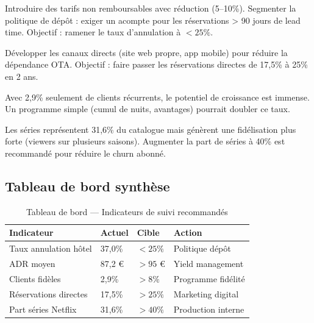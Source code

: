 \documentclass[12pt,a4paper]{article}
\begin{document}
\begin{description}[leftmargin=1.5cm, style=nextline]
  \item[\textcolor{hotel}{\textbf{Réduire les annulations hôtelières}}]
    Introduire des tarifs non remboursables avec réduction (5--10\%). Segmenter la politique de dépôt : exiger un acompte pour les réservations > 90 jours de lead time. Objectif : ramener le taux d'annulation à $< 25\%$.

  \item[\textcolor{gold}{\textbf{Optimiser le mix de distribution}}]
    Développer les canaux directs (site web propre, app mobile) pour réduire la dépendance OTA. Objectif : faire passer les réservations directes de 17,5\% à 25\% en 2 ans.

  \item[\textcolor{green}{\textbf{Développer la fidélisation}}]
    Avec 2,9\% seulement de clients récurrents, le potentiel de croissance est immense. Un programme simple (cumul de nuits, avantages) pourrait doubler ce taux.

  \item[\textcolor{netflix}{\textbf{Diversification du catalogue Netflix}}]
    Les séries représentent 31,6\% du catalogue mais génèrent une fidélisation plus forte (viewers sur plusieurs saisons). Augmenter la part de séries à 40\% est recommandé pour réduire le churn abonné.
\end{description}

\subsection{Tableau de bord synthèse}

\begin{table}[h!]
  \centering
  \caption{Tableau de bord — Indicateurs de suivi recommandés}
  \begin{tabular}{p{4cm}p{3cm}p{3cm}p{4cm}}
    \toprule
    \textbf{Indicateur} & \textbf{Actuel} & \textbf{Cible} & \textbf{Action} \\
    \midrule
    Taux annulation hôtel & 37,0\% & $< 25\%$ & Politique dépôt \\
    ADR moyen & 87,2 € & $> 95$ € & Yield management \\
    Clients fidèles & 2,9\% & $> 8\%$ & Programme fidélité \\
    Réservations directes & 17,5\% & $> 25\%$ & Marketing digital \\
    Part séries Netflix & 31,6\% & $> 40\%$ & Production interne \\
    \bottomrule
  \end{tabular}
\end{table}
\end{document}
